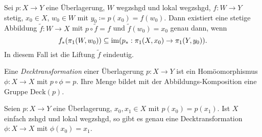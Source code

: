 \documentclass{cheat-sheet}
\newcommand{\Deck}{\mathrm{Deck}} %
\begin{document}
\begin{satz}[Liftungstheorem]
  Sei $p : X \to Y$ eine Überlagerung, $W$ wegzshgd und lokal wegzshgd, $f : W \to Y$ stetig, $x_0 \in X$, $w_0 \in W$ mit $y_0 \coloneqq p(x_0) = f(w_0)$. Dann existiert eine stetige Abbildung $\tilde{f} : W \to X$ mit $p \circ \tilde{f} = f$ und $\tilde{f}(w_0) = x_0$ genau dann, wenn
  \[ f_*(\pi_1(W, w_0)) \subseteq \mathop{\mathrm{im}} (p_* : \pi_1(X, x_0) \to \pi_1(Y, y_0)). \]
  In diesem Fall ist die Liftung $\tilde{f}$ eindeutig.
\end{satz}

\begin{defn}
  Eine \emph{Decktransformation} einer Überlagerung $p : X \to Y$ ist ein Homöomorphismus $\phi : X \to X$ mit $p \circ \phi = p$. Ihre Menge bildet mit der Abbildungs-Komposition eine Gruppe $\Deck(p)$.
\end{defn}

\begin{kor}
  Seien $p : X \to Y$ eine Überlagerung, $x_0, x_1 \in X$ mit $p(x_0) = p(x_1)$. Ist $X$ einfach zshgd und lokal wegzshgd, so gibt es genau eine Decktransformation $\phi : X \to X$ mit $\phi(x_0) = x_1$.
\end{kor}
\end{document}
